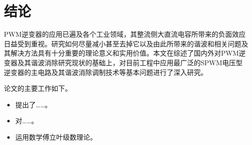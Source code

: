 \section*{结\quad 论}
\begin{spacing}{1.5}

PWM逆变器的应用已遍及各个工业领域，其整流侧大直流电容所带来的负面效应日益受到重视。研究如何尽量减小甚至去掉它以及由此所带来的谐波和相关问题及其解决方法具有十分重要的理论意义和实用价值。本文在综述了国内外对PWM逆变器及其谐波消除研究现状的基础上，对目前工程中应用最广泛的SPWM电压型逆变器的主电路及其谐波消除调制技术等基本问题进行了深入研究。\par
论文的主要工作如下。
\begin{itemize}[topsep=0pt,itemsep=0pt,parsep=0pt,leftmargin=1.5cm]
\item[(1)] 提出了……。
\item[(2)] 对……。
\item[(3)] 运用数学傅立叶级数理论。
\end{itemize}

\end{spacing}